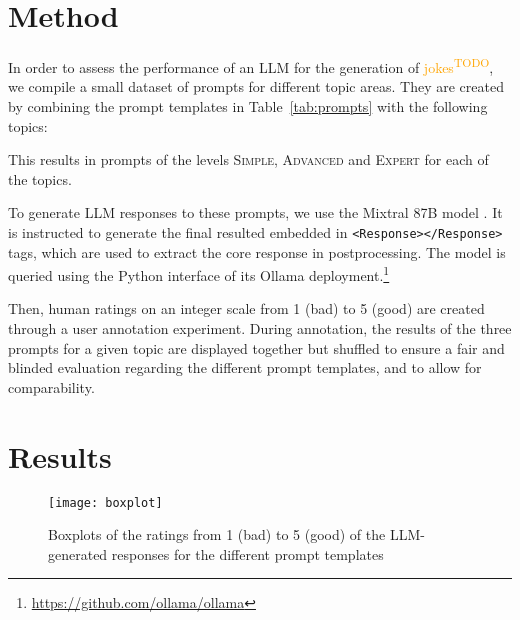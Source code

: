 \documentclass[11pt]{article}
\newcommand{\todo}[1]{\textcolor{orange}{#1\textsuperscript{\footnotesize TODO}}}
\begin{document}
\section{Method}

In order to assess the performance of an LLM for the generation of \todo{jokes}, we compile a small dataset of prompts for different topic areas. They are created by combining the prompt templates in Table~\ref{tab:prompts} with the following topics:




This results in prompts of the levels \textsc{Simple}, \textsc{Advanced} and \textsc{Expert} for each of the topics.

To generate LLM responses to these prompts, we use the Mixtral 8\texttimes 7B model \cite{jiang2024}. It is instructed to generate the final resulted embedded in \texttt{\textless{}Response\textgreater{}\textless{}/Response\textgreater{}} tags, which are used to extract the core response in postprocessing. The model is queried using the Python interface of its Ollama deployment.\footnote{\url{https://github.com/ollama/ollama}}

Then, human ratings on an integer scale from 1 (bad) to 5 (good) are created through a user annotation experiment. During annotation, the results of the three prompts for a given topic are displayed together but shuffled to ensure a fair and blinded evaluation regarding the different prompt templates, and to allow for comparability.


\section{Results}

\begin{figure}\centering
  \texttt{[image: boxplot]}
  \caption{Boxplots of the ratings from 1 (bad) to 5 (good) of the LLM-generated responses for the different prompt templates}
  \label{fig:boxplots}
\end{figure}
\end{document}
